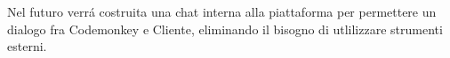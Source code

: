 Nel futuro verrá costruita una chat interna alla piattaforma per permettere un dialogo fra Codemonkey e Cliente, eliminando il bisogno di utlilizzare strumenti esterni.